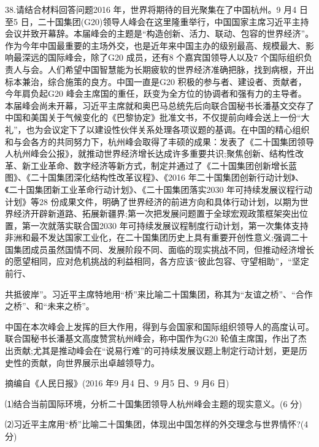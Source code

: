 \documentclass[UTF8,11pt]{ctexart}
\begin{document}
38.请结合材料回答问题2016 年，世界将期待的目光聚集在了中国杭州。9 月4 日至5 日，二十国集团(G20)领导人峰会在这里隆重举行，中国国家主席习近平主持会议并致开幕辞。本届峰会的主题是“构造创新、活力、联动、包容的世界经济”。作为今年中国最重要的主场外交，也是近年来中国主办的级别最高、规模最大、影响最深远的国际峰会，除了G20 成员，还有8 个嘉宾国领导人以及7 个国际组织负责人与会。人们希望中国智慧能为长期疲软的世界经济准确把脉，找到病根，开出标本兼治，综合施策的良方。中国一直是G20 积极的参与者、建设者、贡献者，今年肩负起G20 峰会主席国的重任，跃变为全方位的协调者和强有力的主导者。本届峰会尚未开幕，习近平主席就和奥巴马总统先后向联合国秘书长潘基文交存了中国和美国关于气候变化的《巴黎协定》批准文书，不仅提前向峰会送上一份“大礼”，也为会议定下了以建设性伙伴关系处理各项议题的基调。在中国的精心组织和与会各方的共同努力下，杭州峰会取得了丰硕的成果：发表了《二十国集团领导人杭州峰会公报》，就推动世界经济增长达成许多重要共识;聚焦创新、结构性改革、新工业革命、数字经济等新方式，制定并通过了《二十国集团创新增长蓝图》、《二十国集团深化结构性改革议程》、《2016 年二十国集团创新行动计划》、《二十国集团新工业革命行动计划》、《二十国集团落实2030 年可持续发展议程行动计划》等28 份成果文件，明确了世界经济的前进方向和具体行动计划，以期为世界经济开辟新道路、拓展新疆界;第一次把发展问题置于全球宏观政策框架突出位置，第一次就落实联合国2030 年可持续发展议程制度行动计划，第一次集体支持非洲和最不发达国家工业化，在二十国集团历史上具有重要开创性意义;强调二十国集团成员虽然国情不同、发展阶段不同、面临的现实挑战不同，但推动经济增长的愿望相同，应对危机挑战的利益相同，各方应该“彼此包容、守望相助”，“坚定前行、


共抵彼岸”。习近平主席特地用“桥”来比喻二十国集团，称其为“友谊之桥”、“合作之桥”、和“未来之桥”。

中国在本次峰会上发挥的巨大作用，得到与会国家和国际组织领导人的高度认可。联合国秘书长潘基文高度赞赏杭州峰会，称中国作为G20 轮值主席国，作出了杰出贡献;尤其是推动峰会在“说易行难”的可持续发展议题上制定行动计划，更是历史性的贡献，向世界展示出卓越领导力。

摘编自《人民日报》(2016 年9 月4 日、9 月5 日、9 月6 日)

⑴结合当前国际环境，分析二十国集团领导人杭州峰会主题的现实意义。(6 分)

⑵习近平主席用“桥”比喻二十国集团，体现出中国怎样的外交理念与世界情怀?(4 分)
\end{document}
